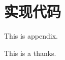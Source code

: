 \documentclass[twoside]{nputhesis}
\begin{document}
\lipsum[4-8]
\section{实现代码}
\lipsum[2-4]

\backmatter



\Appendix
This is appendix.

\Thanks
This is a thanks.

\Work

\statement
\end{document}
